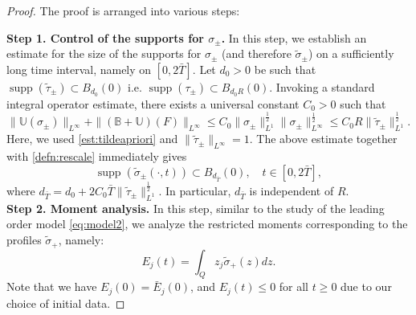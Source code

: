 \documentclass[11pt,reqno]{amsproc}
\newcommand{\tsig}{\tilde{\sigma}}
\DeclareMathOperator{\supp}{supp}
\begin{document}
\begin{proof}
    The proof is arranged into various steps:
    
    \noindent\textbf{Step 1. Control of the supports for $\sigma_\pm$.} In this step, we establish an estimate for the size of the supports for $\sigma_\pm$ (and therefore $\tsig_\pm$) on a sufficiently long time interval, namely on $[0, 2\bar T]$. Let $d_0 >0$ be such that $\supp(\tilde\tau_\pm) \subset B_{d_0}(0)$ i.e. $\supp(\tau_\pm) \subset B_{d_0R}(0)$.
    Invoking a standard integral operator estimate, there exists a universal constant $C_0 > 0$ such that
    $$
    \|\mathbb{U}(\sigma_\pm)\|_{L^\infty} + \|(\mathbb{B} + \mathbb{U})(F)\|_{L^\infty} \le C_0\|\sigma_\pm\|_{L^1}^\frac12 \|\sigma_\pm\|_{L^\infty}^\frac12 \le C_0 R\|\tilde\tau_\pm\|_{L^1}^\frac12.
    $$
    Here, we used \eqref{est:tildeapriori} and $\|\tilde\tau_\pm\|_{L^\infty} = 1$. The above estimate together with \eqref{defn:rescale} immediately gives
    \begin{equation}
        \label{est:suppbd}
        \supp(\tsig_\pm(\cdot,t)) \subset B_{d_{\bar T}}(0),\quad t \in [0,2\bar T],
    \end{equation}
    where $d_{\bar T} = d_0 + 2C_0 \bar T \|\tilde\tau_\pm\|_{L^1}^\frac12$. In particular, $d_{\bar T}$ is independent of $R$.\\

    \noindent\textbf{Step 2. Moment analysis.} In this step, similar to the study of the leading order model \eqref{eq:model2}, we analyze the restricted moments corresponding to the profiles $\tsig_+$, namely:
    \begin{equation}
        \label{defn:tildemoment}
        E_j(t) = \int_Q z_j \tilde\sigma_+(z) dz.
    \end{equation}
    Note that we have $E_j(0) = \bar E_j(0)$, and $E_j(t) \le 0$ for all $t \ge 0$ due to our choice of initial data.
    

\end{proof}
\end{document}
